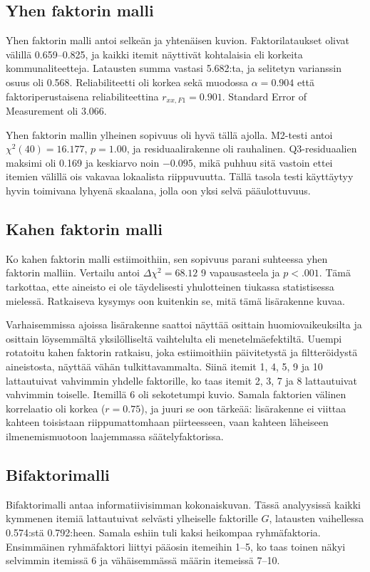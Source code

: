 \documentclass[11pt,a4paper]{article}
\begin{document}
\subsection{Yhen faktorin malli}
Yhen faktorin malli antoi selkeän ja yhtenäisen kuvion. Faktorilataukset olivat välillä 0.659--0.825, ja kaikki itemit näyttivät kohtalaisia eli korkeita kommunaliteetteja. Latausten summa vastasi 5.682:ta, ja selitetyn varianssin osuus oli 0.568. Reliabiliteetti oli korkea sekä muodossa $\alpha = 0.904$ että faktoriperustaisena reliabiliteettina $r_{xx,F1} = 0.901$. Standard Error of Measurement oli 3.066.

Yhen faktorin mallin ylheinen sopivuus oli hyvä tällä ajolla. M2-testi antoi $\chi^2(40)=16.177$, $p=1.00$, ja residuaalirakenne oli rauhalinen. Q3-residuaalien maksimi oli 0.169 ja keskiarvo noin $-0.095$, mikä puhhuu sitä vastoin ettei itemien välillä ois vakavaa lokaalista riippuvuutta. Tällä tasola testi käyttäytyy hyvin toimivana lyhyenä skaalana, jolla oon yksi selvä pääulottuvuus.

\subsection{Kahen faktorin malli}
Ko kahen faktorin malli estiimoithiin, sen sopivuus parani suhteessa yhen faktorin malliin. Vertailu antoi $\Delta \chi^2 = 68.12$ 9 vapausasteela ja $p < .001$. Tämä tarkottaa, ette aineisto ei ole täydelisesti yhulotteinen tiukassa statistisessa mielessä. Ratkaiseva kysymys oon kuitenkin se, mitä tämä lisärakenne kuvaa.

Varhaisemmissa ajoissa lisärakenne saattoi näyttää osittain huomiovaikeuksilta ja osittain löysemmältä yksilölliseltä vaihtelulta eli menetelmäefektiltä. Uuempi rotatoitu kahen faktorin ratkaisu, joka estiimoithiin päivitetystä ja filtteröidystä aineistosta, näyttää vähän tulkittavammalta. Siinä itemit 1, 4, 5, 9 ja 10 lattautuivat vahvimmin yhdelle faktorille, ko taas itemit 2, 3, 7 ja 8 lattautuivat vahvimmin toiselle. Itemillä 6 oli sekotetumpi kuvio. Samala faktorien välinen korrelaatio oli korkea ($r = 0.75$), ja juuri se oon tärkeää: lisärakenne ei viittaa kahteen toisistaan riippumattomhaan piirteesseen, vaan kahteen läheiseen ilmenemismuotoon laajemmassa säätelyfaktorissa.

\subsection{Bifaktorimalli}
Bifaktorimalli antaa informatiivisimman kokonaiskuvan. Tässä analyysissä kaikki kymmenen itemiä lattautuivat selvästi ylheiselle faktorille $G$, latausten vaihellessa 0.574:stä 0.792:heen. Samala eshiin tuli kaksi heikompaa ryhmäfaktoria. Ensimmäinen ryhmäfaktori liittyi pääosin itemeihin 1--5, ko taas toinen näkyi selvimmin itemissä 6 ja vähäisemmässä määrin itemeissä 7--10.
\end{document}
